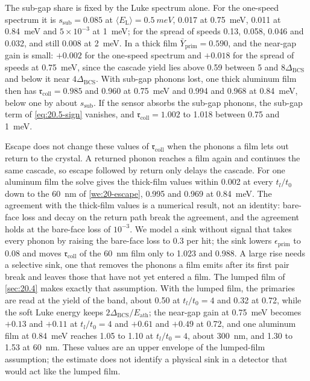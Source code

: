 The sub-gap share is fixed by the Luke spectrum alone. For the one-speed spectrum it is $s_{\mathrm{sub}} = 0.085$ at $\langle E_{\mathrm{L}}\rangle = \SI{0.5}{meV}$, 0.017 at \SI{0.75}{meV}, 0.011 at \SI{0.84}{meV} and $5\times10^{-3}$ at \SI{1}{meV}; for the spread of speeds 0.13, 0.058, 0.046 and 0.032, and still 0.008 at \SI{2}{meV}. In a thick film $\bar Y_{\mathrm{prim}} = 0.590$, and the near-gap gain is small: $+0.002$ for the one-speed spectrum and $+0.018$ for the spread of speeds at \SI{0.75}{meV}, since the cascade yield lies above 0.59 between 5 and $8\Delta_{\mathrm{BCS}}$ and below it near $4\Delta_{\mathrm{BCS}}$. With sub-gap phonons lost, one thick aluminum film then has $\mathfrak{r}_{\mathrm{coll}} = 0.985$ and 0.960 at \SI{0.75}{meV} and 0.994 and 0.968 at \SI{0.84}{meV}, below one by about $s_{\mathrm{sub}}$. If the sensor absorbs the sub-gap phonons, the sub-gap term of \cref{eq:20.5-sign} vanishes, and $\mathfrak{r}_{\mathrm{coll}} = 1.002$ to 1.018 between 0.75 and \SI{1}{meV}.

Escape does not change these values of $\mathfrak{r}_{\mathrm{coll}}$ when the phonons a film lets out return to the crystal. A returned phonon reaches a film again and continues the same cascade, so escape followed by return only delays the cascade. For one aluminum film the solve gives the thick-film values within 0.002 at every $t_l/t_0$ down to the \SI{60}{nm} of \cref{we:20-escape}, 0.995 and 0.969 at \SI{0.84}{meV}. The agreement with the thick-film values is a numerical result, not an identity: bare-face loss and decay on the return path break the agreement, and the agreement holds at the bare-face loss of $10^{-3}$. We model a sink without signal that takes every phonon by raising the bare-face loss to 0.3 per hit; the sink lowers $\epsilon_{\mathrm{prim}}$ to 0.08 and moves $\mathfrak{r}_{\mathrm{coll}}$ of the \SI{60}{nm} film only to 1.023 and 0.988. A large rise needs a selective sink, one that removes the phonons a film emits after its first pair break and leaves those that have not yet entered a film. The lumped film of \cref{sec:20.4} makes exactly that assumption. With the lumped film, the primaries are read at the yield of the band, about 0.50 at $t_l/t_0 = 4$ and 0.32 at 0.72, while the soft Luke energy keeps $2\Delta_{\mathrm{BCS}}/E_{\mathrm{ath}}$; the near-gap gain at \SI{0.75}{meV} becomes $+0.13$ and $+0.11$ at $t_l/t_0 = 4$ and $+0.61$ and $+0.49$ at 0.72, and one aluminum film at \SI{0.84}{meV} reaches 1.05 to 1.10 at $t_l/t_0 = 4$, about \SI{300}{nm}, and 1.30 to 1.53 at \SI{60}{nm}. These values are an upper envelope of the lumped-film assumption; the estimate does not identify a physical sink in a detector that would act like the lumped film.

